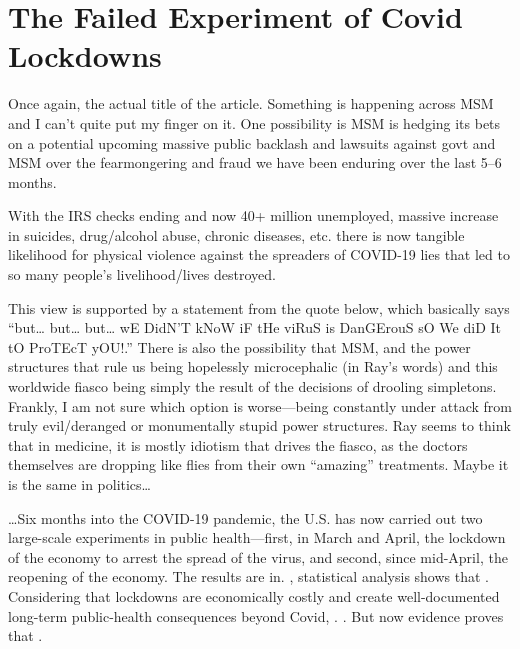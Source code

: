 \chapter{The Failed Experiment of Covid Lockdowns}

\begin{refsection}

Once again, the actual title of the article. Something is happening across MSM and I can't quite put my finger on it. One possibility is MSM is hedging its bets on a potential upcoming massive public backlash and lawsuits against govt and MSM over the fearmongering and fraud we have been enduring over the last 5--6 months.\textsuperscript{\cite{urlc495f420}}

With the IRS checks ending and now 40+ million unemployed, massive increase in suicides, drug/alcohol abuse, chronic diseases, etc. there is now tangible likelihood for physical violence against the spreaders of COVID-19 lies that led to so many people's livelihood/lives destroyed.\textsuperscript{\cite{url40d0c065}}

This view is supported by a statement from the quote below, which basically says \enquote{but\dots{} but\dots{} but\dots{} wE DidN'T kNoW iF tHe viRuS is DanGErouS sO We diD It tO ProTEcT yOU!.} There is also the possibility that MSM, and the power structures that rule us being hopelessly microcephalic (in Ray's words) and this worldwide fiasco being simply the result of the decisions of drooling simpletons. Frankly, I am not sure which option is worse---being constantly under attack from truly evil/deranged or monumentally stupid power structures. Ray seems to think that in medicine, it is mostly idiotism that drives the fiasco, as the doctors themselves are dropping like flies from their own \enquote{amazing} treatments. Maybe it is the same in politics\dots{}

\begin{tcolorbox}[quote]

\dots{}Six months into the COVID-19 pandemic, the U.S. has now carried out two large-scale experiments in public health---first, in March and April, the lockdown of the economy to arrest the spread of the virus, and second, since mid-April, the reopening of the economy. The results are in. , statistical analysis shows that . Considering that lockdowns are economically costly and create well-documented long-term public-health consequences beyond Covid, . . But now evidence proves that .\textsuperscript{\cite{url8ef3be3f}}


\end{tcolorbox}
\end{refsection}
